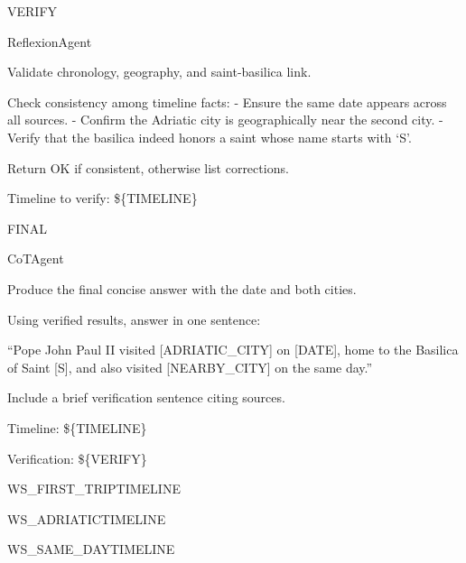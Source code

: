 \begin{userprompt}[title={User Prompt}]
\quad{}VERIFY

\quad{}ReflexionAgent

\quad{}
Validate chronology, geography, and saint-basilica link.

\quad{}

\qquad{}
Check consistency among timeline facts:
- Ensure the same date appears across all sources.
- Confirm the Adriatic city is geographically near the second city.
- Verify that the basilica indeed honors a saint whose name starts with `S'.

Return OK if consistent, otherwise list corrections.

Timeline to verify:
\$\{TIMELINE\}

\quad{}



\quad{}FINAL

\quad{}CoTAgent

\quad{}
Produce the final concise answer with the date and both cities.

\quad{}

\qquad{}
Using verified results, answer in one sentence:

``Pope John Paul II visited [ADRIATIC\_CITY] on [DATE], home to the Basilica of Saint [S], and also visited [NEARBY\_CITY] on the same day.''

Include a brief verification sentence citing sources.

Timeline:
\$\{TIMELINE\}

Verification:
\$\{VERIFY\}

\quad{}



\quad{}WS\_FIRST\_TRIPTIMELINE

\quad{}WS\_ADRIATICTIMELINE

\quad{}WS\_SAME\_DAYTIMELINE


\end{userprompt}
